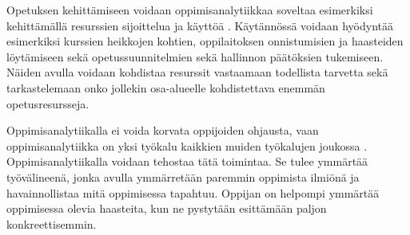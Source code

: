 Opetuksen kehittämiseen voidaan oppimisanalytiikkaa soveltaa esimerkiksi kehittämällä resurssien sijoittelua ja käyttöä \citep{longPenetratingFogAnalytics2011, romeroEducationalDataMining2010}. Käytännössä voidaan hyödyntää esimerkiksi kurssien heikkojen kohtien, oppilaitoksen onnistumisien ja haasteiden löytämiseen sekä opetussuunnitelmien sekä hallinnon päätöksien tukemiseen. Näiden avulla voidaan kohdistaa resurssit vastaamaan todellista tarvetta sekä tarkastelemaan onko jollekin osa-alueelle kohdistettava enemmän opetusresursseja.


Oppimisanalytiikalla ei voida korvata oppijoiden ohjausta, vaan oppimisanalytiikka on yksi työkalu kaikkien muiden työkalujen joukossa \citep{auvinenOppimisanalytiikkaTuleeOletko2017}. Oppimisanalytiikalla voidaan tehostaa tätä toimintaa. Se tulee ymmärtää työvälineenä, jonka avulla ymmärretään paremmin oppimista ilmiönä ja havainnollistaa mitä oppimisessa tapahtuu. Oppijan on helpompi ymmärtää oppimisessa olevia haasteita, kun ne pystytään esittämään paljon konkreettisemmin.




\color{black}